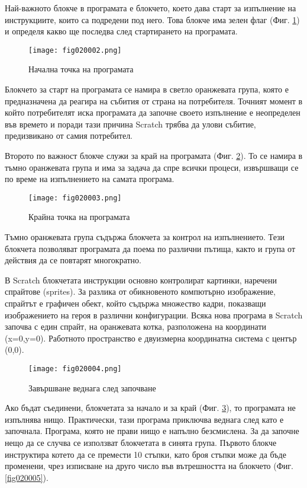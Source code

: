 Най-важното блокче в програмата е блокчето, което дава старт за изпълнение на инструкциите, които са подредени под него. Това блокче има зелен флаг (Фиг. \ref{fig020002}) и определя какво ще последва след стартирането на програмата.

\begin{figure}[H]
  \centering
  \texttt{[image: fig020002.png]}
  \caption{Начална точка на програмата}
\label{fig020002}
\end{figure}

Блокчето за старт на програмата се намира в светло оранжевата група, която е предназначена да реагира на събития от страна на потребителя. Точният момент в който потребителят иска програмата да започне своето изпълнение е неопределен във времето и поради тази причина Scratch трябва да улови събитие, предизвикано от самия потребител. 

Второто по важност блокче служи за край на програмата (Фиг. \ref{fig020003}). То се намира в тъмно оранжевата група и има за задача да спре всички процеси, извършващи се по време на изпълнението на самата програма.

\begin{figure}[H]
  \centering
  \texttt{[image: fig020003.png]}
  \caption{Крайна точка на програмата}
\label{fig020003}
\end{figure}

Тъмно оранжевата група съдържа блокчета за контрол на изпълнението. Тези блокчета позволяват програмата да поема по различни пътища, както и група от действия да се повтарят многократно. 

В Scratch блокчетата инструкции основно контролират картинки, наречени спрайтове (sprites). За разлика от обикновеното компютърно изображение, спрайтът е графичен обект, който съдържа множество кадри, показващи изображението на героя в различни конфигурации. Всяка нова програма в Scratch започва с един спрайт, на оранжевата котка, разположена на координати (x=0,y=0). Работното пространство е двуизмерна координатна система с център (0,0). 

\begin{figure}[H]
  \centering
  \texttt{[image: fig020004.png]}
  \caption{Завършване веднага след започване}
\label{fig020004}
\end{figure}

Ако бъдат съединени, блокчетата за начало и за край (Фиг. \ref{fig020004}), то програмата не изпълнява нищо. Практически, тази програма приключва веднага след като е започнала. Програма, която не прави нищо е напълно безсмислена. За да започне нещо да се случва се използват блокчетата в синята група. Първото блокче инструктира котето да се премести 10 стъпки, като броя стъпки може да бъде променени, чрез изписване на друго число във вътрешността на блокчето (Фиг. \ref{fig020005}).

